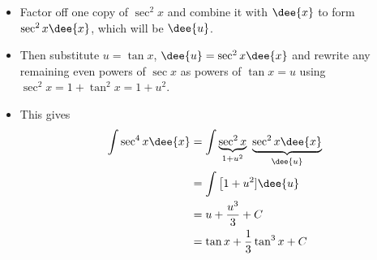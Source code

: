 \begin{eg}\label{eg:TRGINTe}
\soln
\begin{itemize}
 \item Factor off one copy of $\sec^2 x$ and combine it with $\dee{x}$
to form $\sec^2 x\dee{x}$, which will be $\dee{u}$.
\item Then substitute $u=\tan x$, $\dee{u}=\sec^2 x\dee{x}$ and rewrite any remaining even
powers of $\sec x$ as powers of $\tan x=u$ using $\sec^2x = 1+\tan^2 x=1+u^2$.
\item This gives
\begin{align*}
\int \sec^4 x\dee{x}
&= \int \underbrace{\sec^2 x}_{1+u^2}\
        \underbrace{\sec^2 x\dee{x}}_{\dee{u}}  \\
&= \int \big[1+u^2]\dee{u} \\
&=u+\frac{u^3}{3}+C \\
&=\tan x+\frac{1}{3}\tan^3 x + C
\end{align*}
\end{itemize}

\end{eg}
